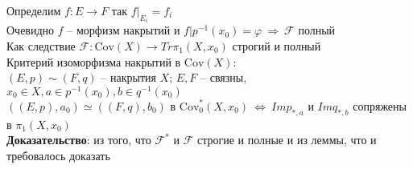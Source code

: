 	Определим $f: E \rightarrow F$ так $f|_{E_i} = f_i$\\
	Очевидно $f$ -- морфизм накрытий и $f|{p}^{-1}(x_0) = \varphi\ \Rightarrow\ \mathcal{F}$ полный\\
	Как следствие $\mathcal{F}: \text{Cov}(X) \rightarrow Tr{\pi}_1 (X, x_0)$ строгий и полный\\
	Критерий изоморфизма накрытий в $\text{Cov}(X)$:\\
	$(E,p)\sim (F,q)$ -- накрытия $X$; $E,F$ -- связны, $x_0 \in X, a \in p^{-1}(x_0), b \in q^{-1}(x_0)$\\
	$((E, p), a_0) \simeq ((F,q), b_0)$ в $\text{Cov}_0^{*}(X, x_0)\ \Leftrightarrow\ Im p_{*,a}$ и $Im q_{*,b}$ сопряжены в ${\pi}_1(X, x_0)$\\
	\textbf{Доказательство}: из того, что $\mathcal{F}^{*}$ и $\mathcal{F}$ строгие и полные и из леммы, что и требовалось доказать\\
	


\newpage
